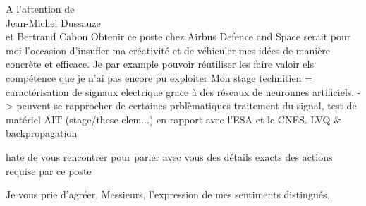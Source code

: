\documentclass[12pt]{lettre}
\begin{document}
\begin{letter}{A l'attention de\\Jean-Michel Dussauze\\et Bertrand Cabon}
{%
Obtenir ce poste chez Airbus Defence and Space serait pour moi l'occasion
d'insufler ma créativité et de véhiculer mes idées de manière concrète et efficace.
Je par example pouvoir réutiliser les
faire valoir els compétence que je n'ai pas encore pu exploiter
Mon stage technitien = caractérisation de signaux electrique grace à des réseaux
de neuronnes artificiels. -> peuvent se rapprocher de certaines prblèmatiques
traitement du signal, test de matériel AIT (stage/these clem...) en rapport avec
l'ESA et le CNES. LVQ \& backpropagation
}

hate de vous rencontrer pour parler avec vous des détails exacts des actions
requise par ce poste

\closing{Je vous prie d'agréer, Messieurs, l'expression de mes sentiments distingués.}
\end{letter}
\end{document}
